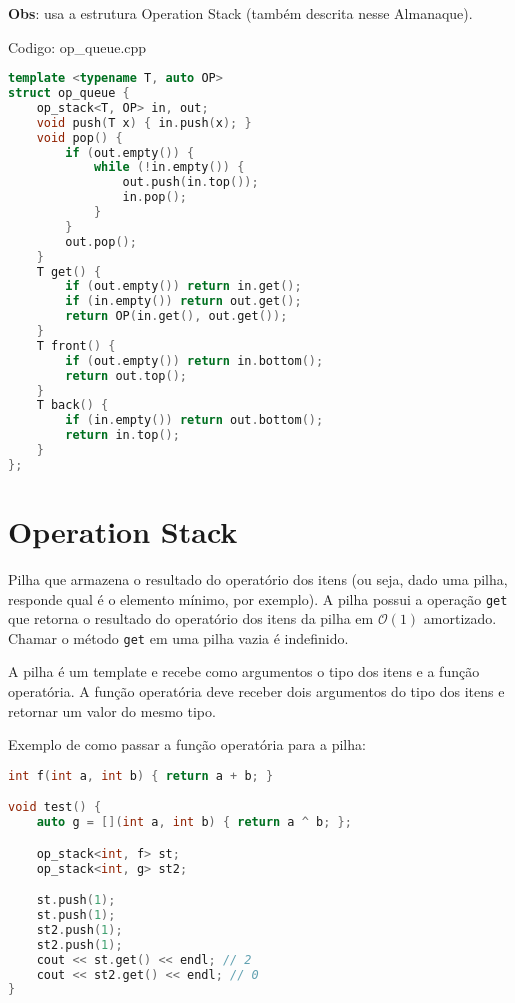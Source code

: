 \documentclass[10pt, a4paper, oneside]{book}
\begin{document}
\textbf{Obs}: usa a estrutura Operation Stack (também descrita nesse Almanaque).

\hfill

Codigo: op\_queue.cpp

\begin{lstlisting}[language=C++]
template <typename T, auto OP>
struct op_queue {
    op_stack<T, OP> in, out;
    void push(T x) { in.push(x); }
    void pop() {
        if (out.empty()) {
            while (!in.empty()) {
                out.push(in.top());
                in.pop();
            }
        }
        out.pop();
    }
    T get() {
        if (out.empty()) return in.get();
        if (in.empty()) return out.get();
        return OP(in.get(), out.get());
    }
    T front() {
        if (out.empty()) return in.bottom();
        return out.top();
    }
    T back() {
        if (in.empty()) return out.bottom();
        return in.top();
    }
};
\end{lstlisting}
\hfill

\section{Operation Stack}


Pilha que armazena o resultado do operatório dos itens (ou seja, dado uma pilha, responde qual é o elemento mínimo, por exemplo). A pilha possui a operação \texttt{get} que retorna o resultado do operatório dos itens da pilha em $\mathcal{O}(1)$ amortizado. Chamar o método \texttt{get} em uma pilha vazia é indefinido.



A pilha é um template e recebe como argumentos o tipo dos itens e a função operatória. A função operatória deve receber dois argumentos do tipo dos itens e retornar um valor do mesmo tipo.



Exemplo de como passar a função operatória para a pilha:

    

\begin{lstlisting}[language=C++]
int f(int a, int b) { return a + b; }

void test() {
    auto g = [](int a, int b) { return a ^ b; };

    op_stack<int, f> st;
    op_stack<int, g> st2;

    st.push(1);
    st.push(1);
    st2.push(1);
    st2.push(1);
    cout << st.get() << endl; // 2
    cout << st2.get() << endl; // 0
}
\end{lstlisting}
\end{document}

